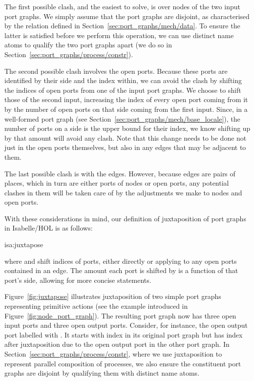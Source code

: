 \documentclass[class=smolathesis,crop=false]{standalone}
\begin{document}
The first possible clash, and the easiest to solve, is over nodes of the two input port graphs.
We simply assume that the port graphs are disjoint, as characterised by the  relation defined in Section~\ref{sec:port_graphs/mech/data}.
To ensure the latter is satisfied before we perform this operation, we can use distinct name atoms to qualify the two port graphs apart (we do so in Section~\ref{sec:port_graphs/process/constr}).

The second possible clash involves the open ports.
Because these ports are identified by their side and the index within, we can avoid the clash by shifting the indices of open ports from one of the input port graphs.
We choose to shift those of the second input, increasing the index of every open port coming from it by the number of open ports on that side coming from the first input.
Since, in a well-formed port graph (see Section~\ref{sec:port_graphs/mech/base_locale}), the number of ports on a side is the upper bound for their index, we know shifting up by that amount will avoid any clash.
Note that this change needs to be done not just in the open ports themselves, but also in any edges that may be adjacent to them.

The last possible clash is with the edges.
However, because edges are pairs of places, which in turn are either ports of nodes or open ports, any potential clashes in them will be taken care of by the adjustments we make to nodes and open ports.

With these considerations in mind, our definition of juxtaposition of port graphs in Isabelle/HOL is as follows:
\begin{isadef}{isa:juxtapose}
  
\end{isadef}
\noindent
where  and  shift indices of ports, either directly or applying to any open ports contained in an edge.
The amount each port is shifted by is a function of that port's side, allowing for more concise statements.

Figure~\ref{fig:juxtapose} illustrates juxtaposition of two simple port graphs representing primitive actions (see the example introduced in Figure~\ref{fig:node_port_graph}).
The resulting port graph now has three open input ports and three open output ports.
Consider, for instance, the open output port labelled with .
It starts with index  in its original port graph but has index  after juxtaposition due to the open output port in the other port graph.
In Section~\ref{sec:port_graphs/process/constr}, where we use juxtaposition to represent parallel composition of processes, we also ensure the constituent port graphs are disjoint by qualifying them with distinct name atoms.
\end{document}

